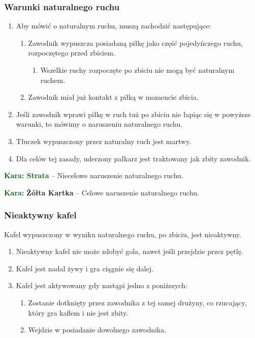 \documentclass[11pt,a4paper]{article}
\newcommand\yellowcard[1]{\bgroup\textcolor{darkgreen}{\textbf{Kara: }}\bgroup\textcolor{darkyellow}{\textbf{Żółta Kartka}} -- #1}
\newcommand\penaltyd[2]{\bgroup\textcolor{darkgreen}{\textbf{Kara: #1}} -- #2}
\begin{document}
\subsubsection{Warunki naturalnego ruchu}
\begin{enumerate}
  \item Aby mówić o naturalnym ruchu, muszą zachodzić następujące:
  \begin{enumerate}
    \item Zawodnik wypuszcza posiadaną piłkę jako część pojedyńczego ruchu, rozpoczętego przed zbiciem.
    \begin{enumerate}
      \item Wszelkie ruchy rozpoczęte po zbiciu nie mogą być naturalnym ruchem.
    \end{enumerate}
    \item Zawodnik miał już kontakt z piłką w momencie zbicia.
  \end{enumerate}
  \item Jeśli zawodnik wprawi piłkę w ruch tuż po zbiciu nie łapiąc się w powyższe warunki, to mówimy o naruszeniu naturalnego ruchu.
  \item Tłuczek wypuszczony przez naturalny ruch jest martwy.
  \item Dla celów tej zasady, uderzony pałkarz jest traktowany jak zbity zawodnik.
\end{enumerate}

\penaltyd{Strata}{Niecelowe naruszenie naturalnego ruchu.}

\yellowcard{Celowe naruszenie naturalnego ruchu.}

\subsubsection{Nieaktywny kafel}
Kafel wypuszczony w wyniku naturalnego ruchu, po zbiciu, jest nieaktywny.
\begin{enumerate}
  \item Nieaktywny kafel nie może zdobyć gola, nawet jeśli przejdzie przez pętlę.
  \item Kafel jest nadal żywy i gra ciągnie się dalej.
  \item Kafel jest aktywowany gdy nastąpi jedno z poniższych:
  \begin{enumerate}
    \item Zostanie dotknięty przez zawodnika z tej samej drużyny, co rzucający, który gra kaflem i nie jest zbity.
    \item Wejdzie w posiadanie dowolnego zawodnika.
  \end{enumerate}
\end{enumerate}
\end{document}
